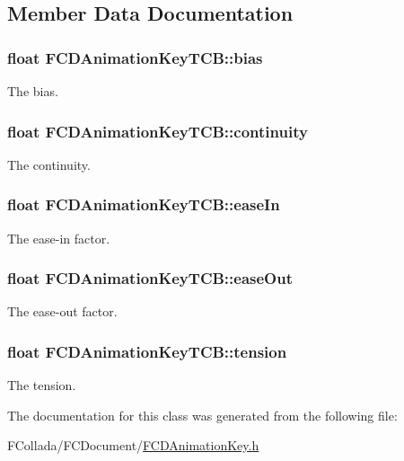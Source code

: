 \subsection{Member Data Documentation}
\hypertarget{classFCDAnimationKeyTCB_a1676e8d6fded46456f042f9fb20e7c1d}{
\subsubsection[{bias}]{\setlength{\rightskip}{0pt plus 5cm}float {\bf FCDAnimationKeyTCB::bias}}}
\label{classFCDAnimationKeyTCB_a1676e8d6fded46456f042f9fb20e7c1d}
The bias. \hypertarget{classFCDAnimationKeyTCB_ac82f078ec71eed7e6ed88dad95e2ad45}{
\subsubsection[{continuity}]{\setlength{\rightskip}{0pt plus 5cm}float {\bf FCDAnimationKeyTCB::continuity}}}
\label{classFCDAnimationKeyTCB_ac82f078ec71eed7e6ed88dad95e2ad45}
The continuity. \hypertarget{classFCDAnimationKeyTCB_a256d60dd1899471eae3a633734e7edaa}{
\subsubsection[{easeIn}]{\setlength{\rightskip}{0pt plus 5cm}float {\bf FCDAnimationKeyTCB::easeIn}}}
\label{classFCDAnimationKeyTCB_a256d60dd1899471eae3a633734e7edaa}
The ease-\/in factor. \hypertarget{classFCDAnimationKeyTCB_a45cdf0eff558ae6b5721a65d072e452f}{
\subsubsection[{easeOut}]{\setlength{\rightskip}{0pt plus 5cm}float {\bf FCDAnimationKeyTCB::easeOut}}}
\label{classFCDAnimationKeyTCB_a45cdf0eff558ae6b5721a65d072e452f}
The ease-\/out factor. \hypertarget{classFCDAnimationKeyTCB_ab1f6045357667b2adff959bb737925f1}{
\subsubsection[{tension}]{\setlength{\rightskip}{0pt plus 5cm}float {\bf FCDAnimationKeyTCB::tension}}}
\label{classFCDAnimationKeyTCB_ab1f6045357667b2adff959bb737925f1}
The tension. 

The documentation for this class was generated from the following file:\begin{DoxyCompactItemize}
\item 
FCollada/FCDocument/\hyperlink{FCDAnimationKey_8h}{FCDAnimationKey.h}\end{DoxyCompactItemize}
